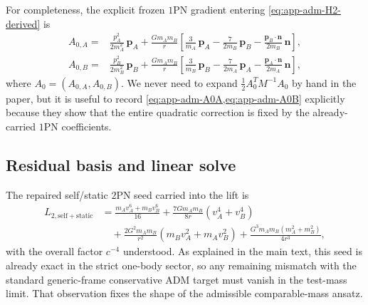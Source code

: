 \documentclass[11pt]{article}
\newcommand{\pvec}{\mathbf p}
\newcommand{\nvec}{\mathbf n}
\newcommand{\OnePN}{\mathrm{1PN}}
\newcommand{\TwoPN}{\mathrm{2PN}}
\newcommand{\ADM}{\mathrm{ADM}}
\begin{document}
For completeness, the explicit frozen \(\OnePN\) gradient entering
\cref{eq:app-adm-H2-derived} is
\begin{align}
A_{0,A}
={}&
\frac{p_A^2}{2m_A^2}\,\pvec_A
+\frac{Gm_A m_B}{r}
\left[
\frac{3}{m_A}\,\pvec_A
-\frac{7}{2m_B}\,\pvec_B
-\frac{\pvec_B\!\cdot\!\nvec}{2m_B}\,\nvec
\right],
\label{eq:app-adm-A0A}
\\
A_{0,B}
={}&
\frac{p_B^2}{2m_B^2}\,\pvec_B
+\frac{Gm_A m_B}{r}
\left[
\frac{3}{m_B}\,\pvec_B
-\frac{7}{2m_A}\,\pvec_A
-\frac{\pvec_A\!\cdot\!\nvec}{2m_A}\,\nvec
\right],
\label{eq:app-adm-A0B}
\end{align}
where \(A_0=(A_{0,A},A_{0,B})\).  We never need to expand
\(\frac12 A_0^T M^{-1}A_0\) by hand in the paper, but it is useful to record
\cref{eq:app-adm-A0A,eq:app-adm-A0B} explicitly because they show that the entire
quadratic correction is fixed by the already-carried \(\OnePN\) coefficients.

\subsection{Residual basis and linear solve}
\label{app:adm-basis}

The repaired self/static \(\TwoPN\) seed carried into the lift is
\begin{equation}
\begin{aligned}
L_{2,\mathrm{self+static}}
&=\frac{m_A v_A^6+m_B v_B^6}{16}
+\frac{7Gm_A m_B}{8r}(v_A^4+v_B^4) \\
&\quad +\frac{2G^2m_A m_B}{r^2}(m_B v_A^2+m_A v_B^2)
+\frac{G^3m_A m_B(m_A^2+m_B^2)}{4r^3},
\end{aligned}
\label{eq:app-adm-self-static-seed}
\end{equation}
with the overall factor \(c^{-4}\) understood.  As explained in the main text, this
seed is already exact in the strict one-body sector, so any remaining mismatch with the
standard generic-frame conservative \(\ADM\) target must vanish in the test-mass limit.
That observation fixes the shape of the admissible comparable-mass ansatz.
\end{document}
